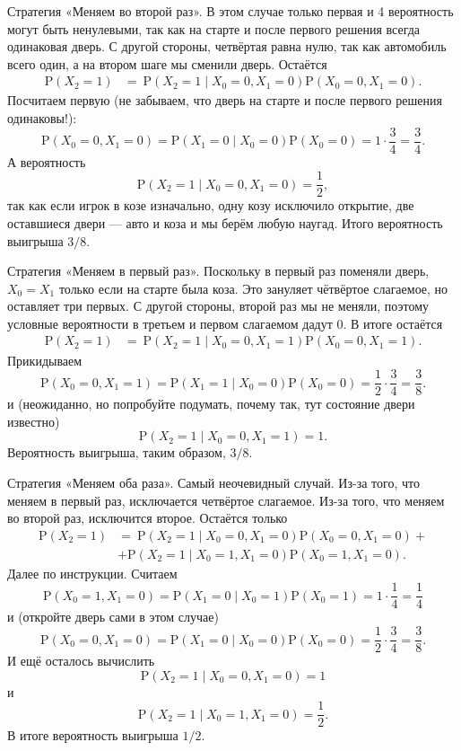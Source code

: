 \documentclass[12pt]{article}
\newcommand{\Proba}[1]{\mathrm{P}\left( #1 \right)}
\newcommand{\Probc}[2]{\mathrm{P}\left( #1 \mid #2\right)}
\begin{document}
\begin{enumerate}
    Стратегия «Меняем во второй раз». 
    В этом случае только первая и 4 вероятность могут быть ненулевыми, 
    так как на старте и после первого решения всегда одинаковая дверь. 
    С другой стороны, четвёртая равна нулю, так как автомобиль всего один, а на втором шаге мы сменили дверь. 
    Остаётся
    \begin{align*}
    \Proba{X_2=1} &= ~ \Probc{X_2=1}{X_0=0,X_1=0} \Proba{X_0=0,X_1=0}.
    \end{align*}
    Посчитаем первую (не забываем, что дверь на старте и после первого решения одинаковы!):
    \[
    \Proba{X_0=0,X_1=0} = \Probc{X_1=0}{X_0=0} \Proba{X_0=0} = 1 \cdot \frac{3}{4} = \frac{3}{4}.
    \]
    А вероятность
    \[
    \Probc{X_2=1}{X_0=0,X_1=0} = \frac{1}{2},
    \]
    так как если игрок в козе изначально, одну козу исключило открытие, 
    две оставшиеся двери — авто и коза и мы берём любую наугад. 
    Итого вероятность выигрыша $3/8$.
    
    Стратегия «Меняем в первый раз». 
    Поскольку в первый раз поменяли дверь, $X_0=X_1$ только если на старте была коза. 
    Это зануляет чётвёртое слагаемое, но оставляет три первых. 
    С другой стороны, второй раз мы не меняли, поэтому условные вероятности в третьем и первом слагаемом дадут $0$. В итоге остаётся
    \begin{align*}
    \Proba{X_2=1} &= ~ \Probc{X_2=1}{X_0=0,X_1=1} \Proba{X_0=0,X_1=1}.
    \end{align*}
    Прикидываем
    \[
    \Proba{X_0=0,X_1=1} = \Probc{X_1=1}{X_0=0} \Proba{X_0=0} = \frac{1}{2} \cdot \frac{3}{4} = \frac{3}{8}.
    \]
    и (неожиданно, но попробуйте подумать, почему так, тут состояние двери известно)
    \[
    \Probc{X_2=1}{X_0=0,X_1=1} = 1.
    \]
    Вероятность выигрыша, таким образом, $3/8$.
    
    Стратегия «Меняем оба раза». 
    Самый неочевидный случай. 
    Из-за того, что меняем в первый раз, исключается четвёртое слагаемое. 
    Из-за того, что меняем во второй раз, исключится второе. 
    Остаётся только
    \begin{align*}
    \Proba{X_2=1} &= ~ \Probc{X_2=1}{X_0=0,X_1=0} \Proba{X_0=0,X_1=0} +\\
    &+ \Probc{X_2=1}{X_0=1,X_1=0} \Proba{X_0=1,X_1=0}.
    \end{align*}
    Далее по инструкции. Считаем
    \[
    \Proba{X_0=1,X_1=0} = \Probc{X_1=0}{X_0=1} \Proba{X_0=1} = 1 \cdot \frac{1}{4} = \frac{1}{4}
    \]
    и (откройте дверь сами в этом случае)
    \[
    \Proba{X_0=0,X_1=0} = \Probc{X_1=0}{X_0=0} \Proba{X_0=0} = \frac{1}{2} \cdot \frac{3}{4} = \frac{3}{8}.
    \]
    И ещё осталось вычислить 
    \[
    \Probc{X_2=1}{X_0=0,X_1=0} = 1 
    \]
    и
    \[
    \Probc{X_2=1}{X_0=1,X_1=0} = \frac{1}{2}.
    \]
    В итоге вероятность выигрыша $1/2$.
    

\end{enumerate}
\end{document}
